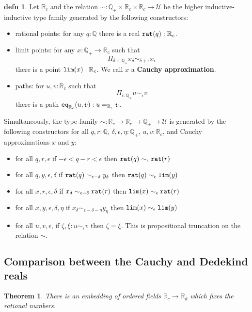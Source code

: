 \documentclass{amsart}
\theoremstyle{theorem}
\newtheorem*{thm}{Theorem}
\theoremstyle{definition}
\newtheorem*{defn}{defn}
\theoremstyle{remark}
\newcommand{\0}{\mathbbe{0}}
\newcommand{\1}{\mathbbe{1}}
\newcommand{\2}{\mathbbe{2}}
\newcommand{\3}{\mathbbe{3}}
\newcommand{\4}{\mathbbe{4}}
\newcommand{\QQ}{\mathbb{Q}}
\newcommand{\RR}{\mathbb{R}}
\newcommand{\term}[1]{{\textup{\texttt{#1}}}}
\newcommand{\UU}{{\mathcal{U}}}
\begin{document}
\begin{defn} Let $\RR_c$ and the relation $\sim \colon \QQ_+ \times \RR_c \times \RR_c \to \UU$ be the higher inductive-inductive type family generated by the following constructors:
\begin{itemize}
\item rational points: for any $q : \QQ$ there is a real $\term{rat}(q) : \RR_c$.
\item limit points: for any $x : \QQ_+ \to \RR_c$ such that 
\[ \Pi_{\delta,\epsilon :\QQ_+} x_\delta \sim_{\delta+\epsilon} x_\epsilon\]
there is a point $\term{lim}(x) : \RR_c$. We call $x$ a \textbf{Cauchy approximation}.
\item paths: for $u,v : \RR_c$ such that
\[ \Pi_{\epsilon : \QQ_+} u \sim_\epsilon v\]
there is a path $\term{eq}_{\RR_c}(u,v) : u =_{\RR_c} v$.
\end{itemize}
Simultaneously, the type family $\sim \colon \RR_c \to \RR_c \to \QQ_+ \to \UU$ is generated by the following constructors for all $q,r : \QQ$, $\delta, \epsilon,\eta : \QQ_+$, $u,v : \RR_c$, and Cauchy approximations $x$ and $y$:
\begin{itemize}
\item for all $q,r,\epsilon$ if $-\epsilon < q-r < \epsilon$ then $\term{rat}(q) \sim_\epsilon \term{rat}(r)$
\item for all $q,y,\epsilon,\delta$ if $\term{rat}(q) \sim_{\epsilon-\delta} y_\delta$ then $\term{rat}(q) \sim_\epsilon \term{lim}(y)$
\item for all $x,r,\epsilon,\delta$ if $x_\delta \sim_{\epsilon-\delta} \term{rat}(r)$ then $\term{lim}(x) \sim_\epsilon \term{rat}(r)$
\item for all $x,y,\epsilon,\delta,\eta$ if $x_\delta \sim_{\epsilon-\delta-\eta} y_\eta$ then $\term{lim}(x) \sim_\epsilon \term{lim}(y)$
\item for all $u,v,\epsilon$, if $\zeta, \xi : u\sim_\epsilon v$ then $\zeta = \xi$. This is propositional truncation on the relation $\sim$.
\end{itemize}
\end{defn}

\subsection*{Comparison between the Cauchy and Dedekind reals}

\begin{thm} There is an embedding of ordered fields $\RR_c \to \RR_d$ which fixes the rational numbers.
\end{thm}
\end{document}

